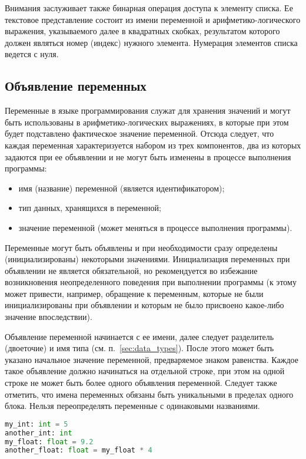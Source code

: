Внимания заслуживает также бинарная операция доступа к элементу списка.
Ее текстовое представление состоит из имени переменной и арифметико-логического выражения, указываемого далее в квадратных скобках, результатом которого должен являться номер (индекс) нужного элемента.
Нумерация элементов списка ведется с нуля.

\subsection{Объявление переменных}
\label{sec:var_declaration}

Переменные в языке программирования служат для хранения значений и могут быть использованы в арифметико-логических выражениях, в которые при этом будет подставлено фактическое значение переменной.
Отсюда следует, что каждая переменная характеризуется набором из трех компонентов, два из которых задаются при ее объявлении и не могут быть изменены в процессе выполнения программы:

\begin{itemize}
    \item имя (название) переменной (является идентификатором);
    \item тип данных, хранящихся в переменной;
    \item значение переменной (может меняться в процессе выполнения программы).
\end{itemize}

Переменные могут быть объявлены и при необходимости сразу определены (инициализированы) некоторыми значениями.
Инициализация переменных при объявлении не является обязательной, но рекомендуется во избежание возникновения неопределенного поведения при выполнении программы (к этому может привести, например, обращение к переменным, которые не были инициализированы при объявлении и которым не было присвоено какое-либо значение впоследствии).

Объявление переменной начинается с ее имени, далее следует разделитель (двоеточие) и имя типа (см. п.~\ref{sec:data_types}).
После этого может быть указано начальное значение переменной, предваряемое знаком равенства.
Каждое такое объявление должно начинаться на отдельной строке, при этом на одной строке не может быть более одного объявления переменной.
Следует также отметить, что имена переменных обязаны быть уникальными в пределах одного блока.
Нельзя переопределять переменные с одинаковыми названиями.

\begin{lstlisting}[language=Python, caption=Примеры объявлений переменных]
my_int: int = 5
another_int: int
my_float: float = 9.2
another_float: float = my_float * 4
\end{lstlisting}

